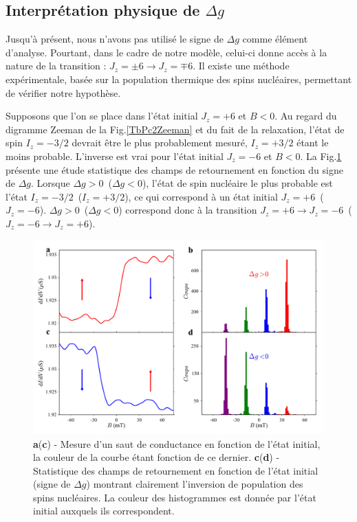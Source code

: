 \subsection{Interprétation physique de $\Delta g$}
Jusqu'à présent, nous n'avons pas utilisé le signe de $\Delta g$ comme élément d'analyse. Pourtant, dans le cadre de notre modèle, celui-ci donne accès à la nature de la transition : $J_z = \pm6 \rightarrow J_z = \mp 6$. Il existe une méthode expérimentale, basée sur la population thermique des spins nucléaires, permettant de vérifier notre hypothèse.

Supposons que l'on se place dans l'état initial $J_z=+6$ et $B<0$. Au regard du digramme Zeeman de la Fig.\ref{TbPc2Zeeman} et du fait de la relaxation, l'état de spin $I_z = -3/2$ devrait être le plus probablement mesuré, $I_z = +3/2$ étant le moins probable. L'inverse est vrai pour l'état initial $J_z=-6$ et $B<0$. La Fig.\ref{analyse_signe_saut} présente une étude statistique des champs de retournement en fonction du signe de $\Delta g$. Lorsque $\Delta g> 0$~($\Delta g< 0$), l'état de spin nucléaire le plus probable est l'état $I_z = -3/2$~($I_z = +3/2$), ce qui correspond à un état initial $J_z=+6$~($J_z=-6$). $\Delta g> 0$~($\Delta g< 0$) correspond donc à la transition $J_z = +6 \rightarrow J_z =  - 6$~($J_z = -6 \rightarrow J_z =  + 6$).

\begin{figure}
\includegraphics[scale=0.45]{Resultats/JumpSens/JumpSens.pdf} 
\caption{\textbf{a}(\textbf{c}) - Mesure d'un saut de conductance en fonction de l'état initial, la couleur de la courbe étant fonction de ce dernier. \textbf{c}(\textbf{d}) - Statistique des champs de retournement en fonction de l'état initial (signe de $\Delta g$) montrant clairement l'inversion de population des spins nucléaires. La couleur des histogrammes est donnée par l'état initial auxquels ils correspondent.}
\label{analyse_signe_saut}
\end{figure}


